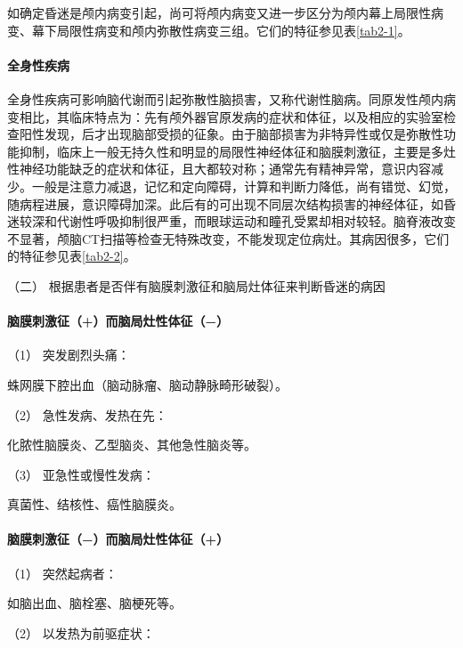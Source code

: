 如确定昏迷是颅内病变引起，尚可将颅内病变又进一步区分为颅内幕上局限性病变、幕下局限性病变和颅内弥散性病变三组。它们的特征参见表\ref{tab2-1}。

\paragraph{全身性疾病}

全身性疾病可影响脑代谢而引起弥散性脑损害，又称代谢性脑病。同原发性颅内病变相比，其临床特点为：先有颅外器官原发病的症状和体征，以及相应的实验室检查阳性发现，后才出现脑部受损的征象。由于脑部损害为非特异性或仅是弥散性功能抑制，临床上一般无持久性和明显的局限性神经体征和脑膜刺激征，主要是多灶性神经功能缺乏的症状和体征，且大都较对称；通常先有精神异常，意识内容减少。一般是注意力减退，记忆和定向障碍，计算和判断力降低，尚有错觉、幻觉，随病程进展，意识障碍加深。此后有的可出现不同层次结构损害的神经体征，如昏迷较深和代谢性呼吸抑制很严重，而眼球运动和瞳孔受累却相对较轻。脑脊液改变不显著，颅脑CT扫描等检查无特殊改变，不能发现定位病灶。其病因很多，它们的特征参见表\ref{tab2-2}。

\hypertarget{text00010.htmlux5cux23CHP1-2-2-4-2}{}
（二） 根据患者是否伴有脑膜刺激征和脑局灶体征来判断昏迷的病因

\paragraph{脑膜刺激征（+）而脑局灶性体征（−）}

\hypertarget{text00010.htmlux5cux23CHP1-2-2-4-2-1-1}{}
（1） 突发剧烈头痛：

蛛网膜下腔出血（脑动脉瘤、脑动静脉畸形破裂）。

\hypertarget{text00010.htmlux5cux23CHP1-2-2-4-2-1-2}{}
（2） 急性发病、发热在先：

化脓性脑膜炎、乙型脑炎、其他急性脑炎等。

\hypertarget{text00010.htmlux5cux23CHP1-2-2-4-2-1-3}{}
（3） 亚急性或慢性发病：

真菌性、结核性、癌性脑膜炎。

\paragraph{脑膜刺激征（−）而脑局灶性体征（+）}

\hypertarget{text00010.htmlux5cux23CHP1-2-2-4-2-2-1}{}
（1） 突然起病者：

如脑出血、脑栓塞、脑梗死等。

\hypertarget{text00010.htmlux5cux23CHP1-2-2-4-2-2-2}{}
（2） 以发热为前驱症状：

